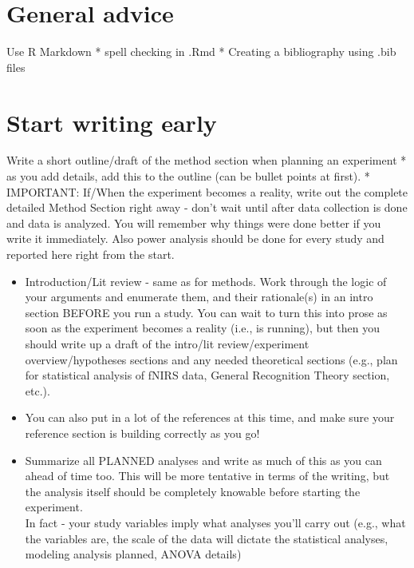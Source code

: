 \documentclass[
]{book}
\begin{document}
\hypertarget{general-advice}{%
\section{General advice}\label{general-advice}}

Use R Markdown
* spell checking in .Rmd
* Creating a bibliography using .bib files

\hypertarget{start-writing-early}{%
\section{Start writing early}\label{start-writing-early}}

Write a short outline/draft of the method section when planning an experiment
* as you add details, add this to the outline (can be bullet points at first).
* IMPORTANT: If/When the experiment becomes a reality, write out the complete detailed Method Section right away - don't wait until after data collection is done and data is analyzed. You will remember why things were done better if you write it immediately. Also power analysis should be done for every study and reported here right from the start.

\begin{itemize}
\item
  Introduction/Lit review - same as for methods. Work through the logic of your arguments and enumerate them, and their rationale(s) in an intro section BEFORE you run a study. You can wait to turn this into prose as soon as the experiment becomes a reality (i.e., is running), but then you should write up a draft of the intro/lit review/experiment overview/hypotheses sections and any needed theoretical sections (e.g., plan for statistical analysis of fNIRS data, General Recognition Theory section, etc.).
\item
  You can also put in a lot of the references at this time, and make sure your reference section is building correctly as you go!
\item
  Summarize all PLANNED analyses and write as much of this as you can ahead of time too. This will be more tentative in terms of the writing, but the analysis itself should be completely knowable before starting the experiment.\\
  In fact - your study variables imply what analyses you'll carry out (e.g., what the variables are, the scale of the data will dictate the statistical analyses, modeling analysis planned, ANOVA details)
\end{itemize}
\end{document}
